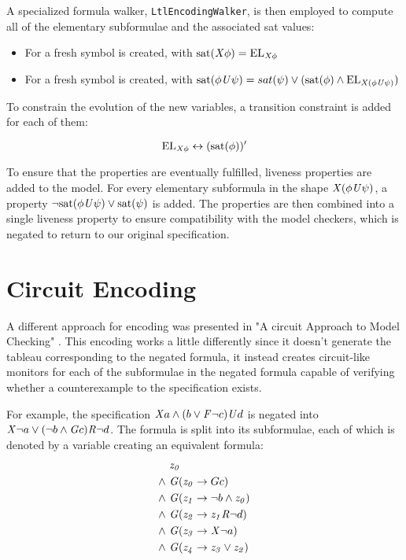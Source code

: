 A specialized formula walker, \texttt{LtlEncodingWalker}, is then employed to compute all of the elementary subformulae and the associated sat values:
\begin{itemize}
    \item For \fX{} a fresh symbol \elx{} is created, with $\mathrm{sat}(\mathit{X}{} \phi) = \mathrm{EL}_{\mathit{X}{} \phi}{}$
    \item For \fU{} a fresh symbol \elu{} is created, with $\mathrm{sat}(\phi \mathit{U}{} \psi) = sat(\psi) \lor (\mathrm{sat}(\phi) \land \mathrm{EL}_{\mathit{X} (\phi \mathit{U}{} \psi)})$
\end{itemize}

To constrain the evolution of the new variables, a transition constraint is added for each of them:

\[ \mathrm{EL}_{\mathit{X}{} \phi}{} \leftrightarrow (\mathrm{sat}(\phi))' \]

To ensure that the properties are eventually fulfilled, liveness properties are added to the model.
For every elementary subformula in the shape $\mathit{X} (\phi \mathit{U}{} \psi)$, a property $\lnot \mathrm{sat}(\phi \mathit{U}{} \psi) \lor \mathrm{sat}(\psi)$ is added.
The properties are then combined into a single liveness property to ensure compatibility with the model checkers, which is negated to return to our original \ltl{} specification.


\section{\ltl{} Circuit Encoding}

A different approach for encoding was presented in "A circuit Approach to \ltl{} Model Checking" \cite{DBLP:conf/fmcad/ClaessenES13}.
This encoding works a little differently since it doesn't generate the tableau corresponding to the negated \ltl{} formula, it instead creates circuit-like monitors for each of the subformulae in the negated \ltl{} formula capable of verifying whether a counterexample to the specification exists.

For example, the specification $\mathit{X} a \land (b \lor \mathit{F} \lnot c) \mathit{U} d$ is negated into $\mathit{X} \lnot a \lor (\lnot b \land \mathit{G} c) \mathit{R} \lnot d$.
The formula is split into its subformulae, each of which is denoted by a variable creating an equivalent formula:
\begin{align}
           &     \mathit{z_0} \\
    \land\ & \mathit{G} (\mathit{z_0} \rightarrow G c) \\
    \land\ & \mathit{G} (\mathit{z_1} \rightarrow \lnot b \land \mathit{z_0}) \\
    \land\ & \mathit{G} (\mathit{z_2} \rightarrow \mathit{z_1} \mathit{R} \lnot d) \\
    \land\ & \mathit{G} (\mathit{z_3} \rightarrow \mathit{X} \lnot a) \\
    \land\ & \mathit{G} (\mathit{z_4} \rightarrow \mathit{z_3} \lor \mathit{z_2})
\end{align}

